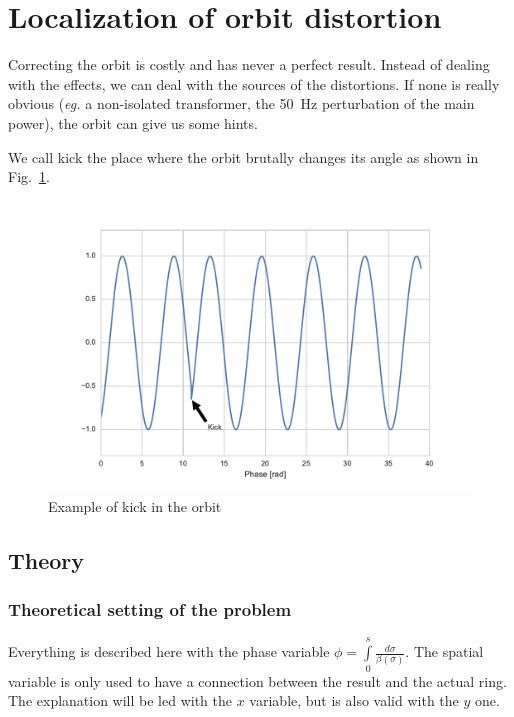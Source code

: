 
\section{Localization of orbit distortion}
\label{sec:localisation}

Correcting the orbit is costly and has never a perfect result. Instead of dealing with the effects, we can deal with the sources of the distortions. If none is really obvious (\textit{eg.} a non-isolated transformer, the 50~Hz perturbation of the main power), the orbit can give us some hints.

We call kick the place where the orbit brutally changes its angle as shown in Fig.~\ref{fig:kick}.

\begin{figure}[!h]
	\centering
	\includegraphics[width=.9\linewidth]{img/kick}
	\caption{\label{fig:kick}Example of kick in the orbit}
\end{figure}

\subsection{Theory}
\label{ssec:loc_theory}

\subsubsection{Theoretical setting of the problem}

Everything is described here with the phase variable $\phi = \int\limits_{0}^s \frac{d\sigma}{\beta(\sigma)}$. The spatial variable is only used to have a connection between the result and the actual ring. The explanation will be led with the $x$ variable, but is also valid with the $y$ one.

